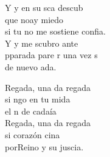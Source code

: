\begin{cancion}[Regalada][Ixcís]
	Y y en su sca descub\\
	que noay miedo\\
	si tu no me sostiene confia.\\
	Y y me scubro ante\\
	pparada pare r una vez s \\
	de nuevo ada.\\
	\begin{chorus}%
	Regada, una da regada\\
	si ngo en tu mida \\
	el n de cadaía\\
	Regada, una da regada\\
	si  corazón cina \\
	porReino y su juscia.\\
	\end{chorus}%
\end{cancion}%
